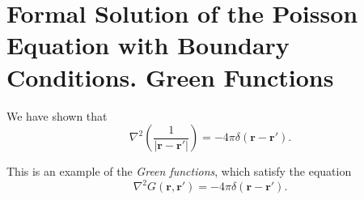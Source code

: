\section{Formal Solution of the  Poisson Equation with Boundary Conditions. Green Functions}
We have shown that
\begin{equation}
\nabla^2 \left( \frac{1}{\left| \textbf{r} - \textbf{r}' \right|} \right) = -4\pi \delta(\textbf{r} - \textbf{r}').
\end{equation}

This is an example of the \textit{Green functions}, which satisfy the equation
\begin{equation}
\nabla^2 G(\textbf{r}, \textbf{r}') = -4\pi \delta(\textbf{r} - \textbf{r}'). \label{eq:GreenFunctionDefinition}
\end{equation}

